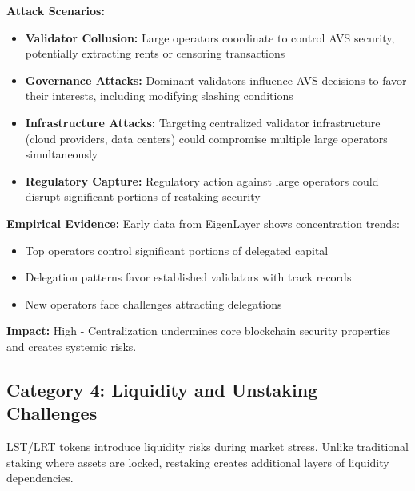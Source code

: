 \documentclass[runningheads]{llncs}
\begin{document}
\textbf{Attack Scenarios:}
\begin{itemize}
    \item \textbf{Validator Collusion:} Large operators coordinate to control AVS security, potentially extracting rents or censoring transactions
    \item \textbf{Governance Attacks:} Dominant validators influence AVS decisions to favor their interests, including modifying slashing conditions
    \item \textbf{Infrastructure Attacks:} Targeting centralized validator infrastructure (cloud providers, data centers) could compromise multiple large operators simultaneously
    \item \textbf{Regulatory Capture:} Regulatory action against large operators could disrupt significant portions of restaking security
\end{itemize}

\textbf{Empirical Evidence:}
Early data from EigenLayer shows concentration trends:
\begin{itemize}
    \item Top operators control significant portions of delegated capital
    \item Delegation patterns favor established validators with track records
    \item New operators face challenges attracting delegations
\end{itemize}

\textbf{Impact:} High - Centralization undermines core blockchain security properties and creates systemic risks.

\subsection{Category 4: Liquidity and Unstaking Challenges}

LST/LRT tokens introduce liquidity risks during market stress. Unlike traditional staking where assets are locked, restaking creates additional layers of liquidity dependencies.
\end{document}
